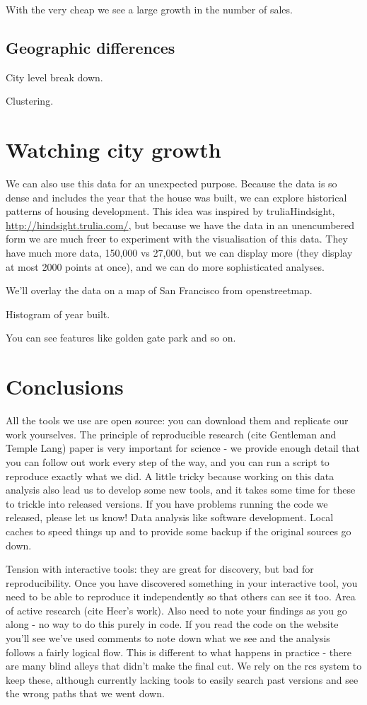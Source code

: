 \documentclass[oneside]{article}
\begin{document}
With the very cheap we see a large growth in the number of sales.

\subsection{Geographic differences}

City level break down.

Clustering.

\section{Watching city growth}

We can also use this data for an unexpected purpose.  Because the data is so dense and includes the year that the house was built, we can explore historical patterns of housing development.  This idea was inspired by truliaHindsight, \url{http://hindsight.trulia.com/}, but because we have the data in an unencumbered form we are much freer to experiment with the visualisation of this data.  They have much more data, 150,000 vs 27,000, but we can display more (they display at most 2000 points at once), and we can do more sophisticated analyses.

We'll overlay the data on a map of San Francisco from openstreetmap.

Histogram of year built.

You can see features like golden gate park and so on.

\section{Conclusions}

All the tools we use are open source: you can download them and replicate our work yourselves.  The principle of reproducible research (cite Gentleman and Temple Lang) paper is very important for science - we provide enough detail that you can follow out work every step of the way, and you can run a script to reproduce exactly what we did.  A little tricky because working on this data analysis also lead us to develop some new tools, and it takes some time for these to trickle into released versions.  If you have problems running the code we released, please let us know!  Data analysis like software development.  Local caches to speed things up and to provide some backup if the original sources go down.

Tension with interactive tools: they are great for discovery, but bad for reproducibility.  Once you have discovered something in your interactive tool, you need to be able to reproduce it independently so that others can see it too.  Area of active research (cite Heer's work).  Also need to note your findings as you go along - no way to do this purely in code.  If you read the code on the website you'll see we've used comments to note down what we see and the analysis follows a fairly logical flow.  This is different to what happens in practice - there are many blind alleys that didn't make the final cut.  We rely on the rcs system to keep these, although currently lacking tools to easily search past versions and see the wrong paths that we went down.
\end{document}
